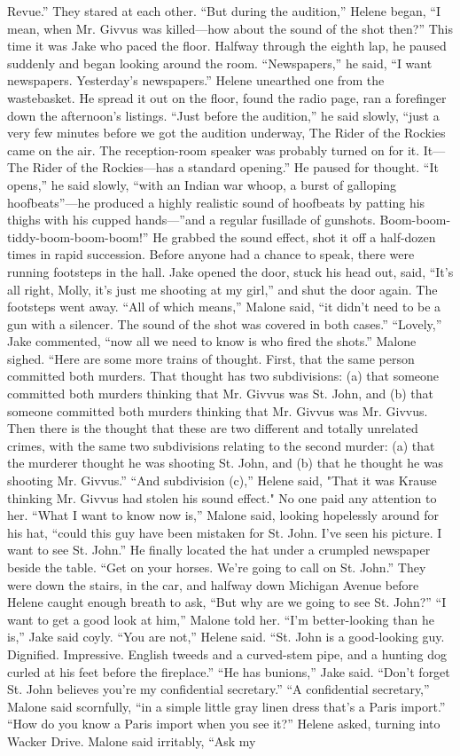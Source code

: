 \documentclass{novel}
\begin{document}
Revue.” They stared at each other. “But during the audition,” Helene began, “I mean, when Mr. Givvus was killed—how about the sound of the shot then?” This time it was Jake who paced the floor. Halfway through the eighth lap, he paused suddenly and began looking around the room. “Newspapers,” he said, “I want newspapers. Yesterday’s newspapers.” Helene unearthed one from the wastebasket. He spread it out on the floor, found the radio page, ran a forefinger down the afternoon’s listings. “Just before the audition,” he said slowly, “just a very few minutes before we got the audition underway, The Rider of the Rockies came on the air. The reception-room speaker was probably turned on for it. It—The Rider of the Rockies—has a standard opening.” He paused for thought. “It opens,” he said slowly, “with an Indian war whoop, a burst of galloping hoofbeats”—he produced a highly realistic sound of hoofbeats by patting his thighs with his cupped hands—”and a regular fusillade of gunshots. Boom-boom-tiddy-boom-boom-boom!” He grabbed the sound effect, shot it off a half-dozen times in rapid succession. Before anyone had a chance to speak, there were running footsteps in the hall. Jake opened the door, stuck his head out, said, “It’s all right, Molly, it’s just me shooting at my girl,” and shut the door again. The footsteps went away. “All of which means,” Malone said, “it didn’t need to be a gun with a silencer. The sound of the shot was covered in both cases.” “Lovely,” Jake commented, “now all we need to know is who fired the shots.” Malone sighed. “Here are some more trains of thought. First, that the same person committed both murders. That thought has two subdivisions: (a) that someone committed both murders thinking that Mr. Givvus was St. John, and (b) that someone committed both murders thinking that Mr. Givvus was Mr. Givvus. Then there is the thought that these are two different and totally unrelated crimes, with the same two subdivisions relating to the second murder: (a) that the murderer thought he was shooting St. John, and (b) that he thought he was shooting Mr. Givvus.” “And subdivision (c),” Helene said, "That it was Krause thinking Mr. Givvus had stolen his sound effect." No one paid any attention to her. “What I want to know now is,” Malone said, looking hopelessly around for his hat, “could this guy have been mistaken for St. John. I've seen his picture. I want to see St. John.” He finally located the hat under a crumpled newspaper beside the table. “Get on your horses. We’re going to call on St. John.” They were down the stairs, in the car, and halfway down Michigan Avenue before Helene caught enough breath to ask, “But why are we going to see St. John?” “I want to get a good look at him,” Malone told her. “I’m better-looking than he is,” Jake said coyly. “You are not,” Helene said. “St. John is a good-looking guy. Dignified. Impressive. English tweeds and a curved-stem pipe, and a hunting dog curled at his feet before the fireplace.” “He has bunions,” Jake said. “Don’t forget St. John believes you’re my confidential secretary.” “A confidential secretary,” Malone said scornfully, “in a simple little gray linen dress that’s a Paris import.” “How do you know a Paris import when you see it?” Helene asked, turning into Wacker Drive. Malone said irritably, “Ask my 
\end{document}
